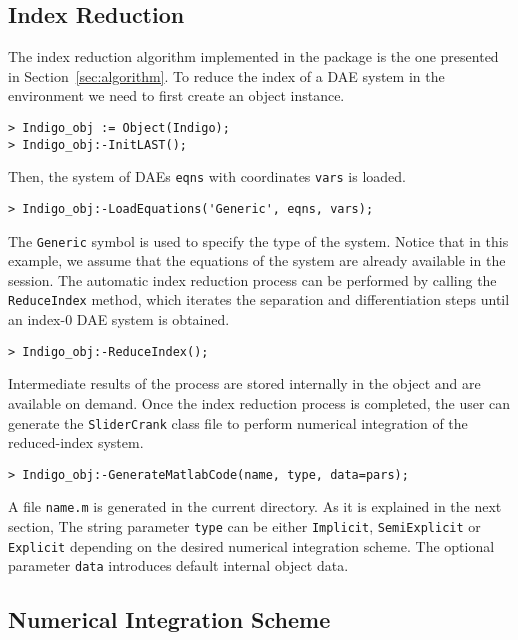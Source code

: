 \subsection{Index Reduction}

The index reduction algorithm implemented in the \Indigo{} \Maple{} package is the one presented in Section~\ref{sec:algorithm}. To reduce the index of a \ac{DAE} system in the \Maple{} environment we need to first create an \Indigo{} object instance.
%
\begin{verbatim}
> Indigo_obj := Object(Indigo);
> Indigo_obj:-InitLAST();
\end{verbatim}
%
Then, the system of \acp{DAE} \texttt{eqns} with coordinates \texttt{vars} is loaded.
%
\begin{verbatim}
> Indigo_obj:-LoadEquations('Generic', eqns, vars);
\end{verbatim}
%
The \texttt{Generic} symbol is used to specify the type of the system. Notice that in this example, we assume that the equations of the system are already available in the \Maple{} session. The automatic index reduction process can be performed by calling the \texttt{ReduceIndex} method, which iterates the separation and differentiation steps until an index-$0$ \ac{DAE} system is obtained.
%
\begin{verbatim}
> Indigo_obj:-ReduceIndex();
\end{verbatim}
%
Intermediate results of the process are stored internally in the \Indigo{} object and are available on demand. Once the index reduction process is completed, the user can generate the \texttt{SliderCrank} \Matlab{} class file to perform numerical integration of the reduced-index system.
%
\begin{verbatim}
> Indigo_obj:-GenerateMatlabCode(name, type, data=pars);
\end{verbatim}
%
A file \texttt{name.m} is generated in the current directory. As it is explained in the next section, The string parameter \texttt{type} can be either \texttt{Implicit}, \texttt{SemiExplicit} or \texttt{Explicit} depending on the desired numerical integration scheme. The optional parameter \texttt{data} introduces default internal object data.

\subsection{Numerical Integration Scheme}

